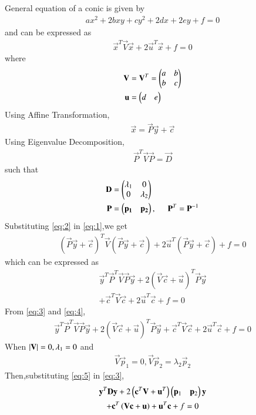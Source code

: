 \documentclass[journal,12pt,twocolumn]{IEEEtran}
\begin{document}
General equation of a conic is given by
\begin{align}
ax^2+2bxy+cy^2+2dx+2ey+f=0 \label{eq:15}
\end{align}
and can be expressed as 
\begin{align}
    \vec{x}^T\vec{V}\vec{x} + 2\vec{u}^T\vec{x} + f = 0 \label{eq:1}
\end{align}
where
\begin{align}
    \mathbf{V}&=\mathbf{V}^T=\begin{pmatrix}a & b\\b & c\end{pmatrix}
    \\
    \mathbf{u}&=\begin{pmatrix}d & e\end{pmatrix}
\end{align}
Using Affine Transformation,
\begin{align}
    \vec{x}=\vec{P}\vec{y}+\vec{c} \label{eq:2}
\end{align}
Using Eigenvalue Decomposition,
\begin{align}
    \vec{P}^T\vec{V}\vec{P}=\vec{D} \label{eq:4}
\end{align}
such that
\begin{align}
    \mathbf{D} &= \begin{pmatrix}\lambda_1 & 0 \\ 0 & \lambda_2\end{pmatrix}
    \\
    \mathbf{P} &= \begin{pmatrix}\mathbf{p_1} & \mathbf{p_2}\end{pmatrix},\hspace{0.5cm}
    \mathbf{P}^T = \mathbf{P}^{-1} \label{eq:5}
\end{align}
Substituting \eqref{eq:2} in \eqref{eq:1},we get
\begin{align}
    (\vec{P}\vec{y}+\vec{c})^T\vec{V}(\vec{P}\vec{y}+\vec{c}) + 2\vec{u}^T(\vec{P}\vec{y}+\vec{c}) + f = 0
\end{align}
which can be expressed as
\begin{multline}
\vec{y}^T\vec{P}^T\vec{V}\vec{P}\vec{y} + 2(\vec{V}\vec{c} + \vec{u})^T \vec{P}\vec{y}\\
+ \vec{c}^T\vec{V}\vec{c} + 2\vec{u}^T\vec{c} + f = 0 \label{eq:3}
\end{multline}
From \eqref{eq:3} and \eqref{eq:4},
\begin{align}
    \vec{y}^T\vec{P}^T\vec{V}\vec{P}\vec{y} + 2(\vec{V}\vec{c} + \vec{u})^T \vec{P}\vec{y} + \vec{c}^T\vec{V}\vec{c} + 2\vec{u}^T\vec{c} + f = 0
\end{align}
When $\left\vert\mathbf{V}\right\vert = 0, \lambda_1 = 0$ and 
\begin{align}
\vec{V}\vec{p}_1 = 0, 
\vec{V}\vec{p}_2 = \lambda_2\vec{p}_2
\end{align}
Then,substituting \eqref{eq:5} in \eqref{eq:3},
\begin{multline}
\mathbf{y}^T\mathbf{D}\mathbf{y}+2\left(\mathbf{c}^T\mathbf{V}+\mathbf{u}^T\right)\begin{pmatrix}\mathbf{p}_1 & \mathbf{p}_2\end{pmatrix}\mathbf{y}
\\
+  \mathbf{c}^T\left(\mathbf{V}\mathbf{c} + \mathbf{u}\right)+ \mathbf{u}^T\mathbf{c} + f= 0
\end{multline}
\end{document}
